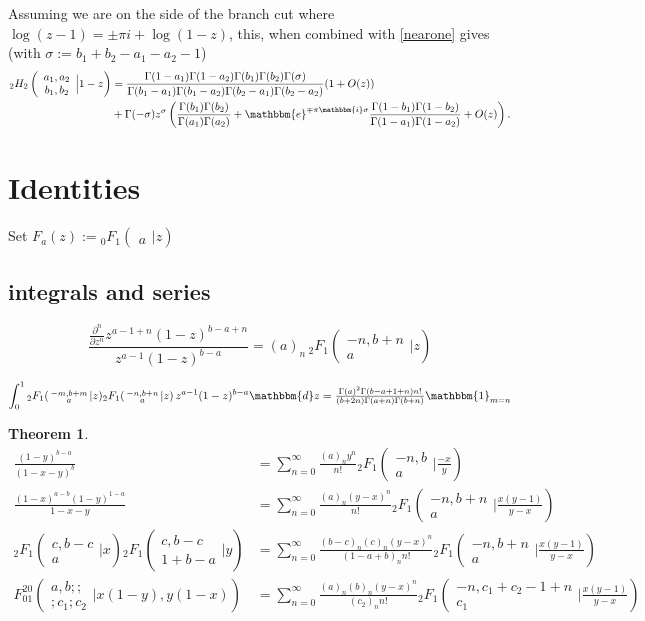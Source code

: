 \documentclass[12pt]{article}
\newcommand{\ee}[0] {\mathbbm{e}}
\newcommand{\ii}[0] {\mathbbm{i}}
\newcommand{\dd}[0] {\mathbbm{d}}
\newcommand{\one}[0] {\mathbbm{1}}
\numberwithin{equation}{section}
\newtheorem{theorem}{Theorem}[section]
\newcommand{\Head}[3] {{}_{#1}{#2}_{#3}}
\newcommand{\ArgS}[3] {( \begin{smallmatrix} #1 \\ #2 \end{smallmatrix} | {#3})}
\newcommand{\HypJ}[2] {F_{#1}(#2)}
\newcommand{\TwoHead}[3] {{#1}_{#3}^{#2}}
\newcommand{\HypFfourS}[6] {\TwoHead{F}{2 0}{0 1} \ArgS{{#1},{#2};;}{;{#3};{#4}}{{#5},{#6}}}
\newcommand{\FF}[6] {{}_{#1}{#2}_{#3} \left( \begin{array}{c} #4 \\ #5 \end{array} \Big| {#6}  \right)}
\begin{document}
Assuming we are on the side of the branch cut where $\log(z-1) = \pm \pi i + \log(1-z)$, this, when combined with \eqref{nearone} gives (with $\sigma := b_1+b_2-a_1-a_2-1$)
\begin{align*}
\FF{2}{H}{2}{a_1,a_2}{b_1,b_2}{1-z} &= \frac{\Gamma(1-a_1)\Gamma(1-a_2)\Gamma(b_1)\Gamma(b_2)\Gamma(\sigma)}{\Gamma(b_1-a_1)\Gamma(b_1-a_2)\Gamma(b_2-a_1)\Gamma(b_2-a_2)}(1 + O(z))\\
&+ \Gamma(-\sigma) z^{\sigma} \left(\frac{\Gamma(b_1)\Gamma(b_2)}{\Gamma(a_1)\Gamma(a_2)} + \ee^{\mp \pi \ii \sigma} \frac{\Gamma(1-b_1)\Gamma(1-b_2)}{\Gamma(1-a_1)\Gamma(1-a_2)} + O(z)\right)\text{.}
\end{align*}



\section{Identities}

Set $\HypJ{a}{z} := \Head{0}{F}{1} \ArgS{}{a}{z}$

\subsection{integrals and series}

\begin{equation*}
\frac{\frac{\partial^n}{\partial z^n} z^{a-1+n}(1-z)^{b-a+n}}{z^{a-1}(1-z)^{b-a}} = (a)_n \, \Head{2}{F}{1} \ArgS{-n,b+n}{a}{z}
\end{equation*}

\begin{equation*}
\int_0^1 \Head{2}{F}{1} \ArgS{-m,b+m}{a}{z} \Head{2}{F}{1} \ArgS{-n,b+n}{a}{z} \, z^{a-1}(1-z)^{b-a} \dd z = \tfrac{\Gamma (a)^2 \Gamma(b-a+1+n) n!}{(b+2 n) \Gamma (a+n) \Gamma(b+n)} \one_{m=n}
\end{equation*}

\begin{theorem}
\begin{align*}
\tfrac{(1-y)^{b-a}}{(1-x-y)^b} &= \sum_{n=0}^{\infty} \tfrac{(a)_n y^n}{n!} \Head{2}{F}{1} \ArgS{-n,b}{a}{\tfrac{-x}{y}}\\
\tfrac{(1-x)^{a-b}(1-y)^{1-a}}{1-x-y} &= \sum_{n=0}^{\infty} \tfrac{(a)_n (y-x)^n}{n!} \Head{2}{F}{1} \ArgS{-n,b+n}{a}{\tfrac{x(y-1)}{y-x}}\\
\Head{2}{F}{1} \ArgS{c,b-c}{a}{x} \Head{2}{F}{1} \ArgS{c,b-c}{1+b-a}{y} &= \sum_{n=0}^{\infty} \tfrac{(b-c)_n (c)_n (y-x)^n}{(1-a+b)_n n!} \Head{2}{F}{1} \ArgS{-n,b+n}{a}{\tfrac{x(y-1)}{y-x}}\\
\HypFfourS{a}{b}{c_1}{c_2}{x(1-y)}{y(1-x)} &= \sum_{n=0}^{\infty} \tfrac{(a)_n (b)_n (y-x)^n}{(c_2)_n n!} \Head{2}{F}{1} \ArgS{-n,c_1+c_2-1+n}{c_1}{\tfrac{x(y-1)}{y-x}}
\end{align*}
\end{theorem}
\end{document}
